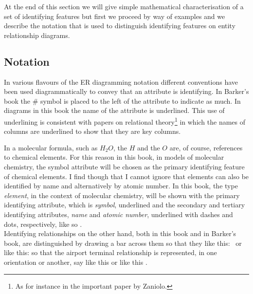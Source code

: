 At the end of this section we will give simple mathematical characterisation of a set of identifying features but first
we proceed by way of examples 
and we describe the notation that is used to distinguish identifying features on entity relationship  diagrams.

\subsection{Notation}
\mynote
In various flavours of the ER diagramming notation different conventions have been used diagrammatically to convey that an attribute is identifying. In Barker's book the \# symbol is placed to the left of the attribute to indicate as much. In diagrams in this book the name of the attribute is underlined. This use of underlining is consistent with papers on relational theory\footnote{As for instance in the important paper by Zaniolo.} in which  the names of columns are underlined to show that they are key columns.

\mynote
In a molecular formula, such as $H_2O$, the $H$ and the $O$ are, of course, references to chemical elements. For this reason in this book,
in models of molecular chemistry, the symbol attribute will be chosen as the primary identifying feature of chemical elements. I find though that I cannot ignore that elements can also be identified by name and alternatively by atomic number. 
In this book, the type \textit{element}, in the context of molecular chemistry, will be shown with the primary identifying attribute, which is \textit{symbol}, underlined and the secondary and tertiary identifying attributes, \textit{name} and \textit{atomic number}, underlined with dashes and dots, respectively, like so
\raisebox{-0.85cm}{\scalebox{0.95}{}}.\\
\vspace{0.2cm}
\mynote Identifying relationships on the other hand, both in this book and in Barker's book,
are distinguished by drawing a bar across them so that they like this: \barkerEllisJ\ or like this: \barkerEllisK so that the airport terminal relationship is represented, 
in one orientation or another, say like this
\raisebox{-1.4cm}{\scalebox{0.9}{}} 
or like this \raisebox{-0.45cm}{\scalebox{0.9}{}}.


